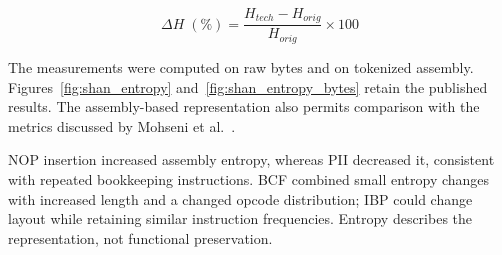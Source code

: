 \documentclass[runningheads]{llncs}
\begin{document}
\begin{equation}
\Delta H \; (\%) = \frac{H_{tech} - H_{orig}}{H_{orig}} \times 100
\end{equation}

The measurements were computed on raw bytes and on tokenized assembly. Figures~\ref{fig:shan_entropy} and~\ref{fig:shan_entropy_bytes} retain the published results. The assembly-based representation also permits comparison with the metrics discussed by Mohseni et al.~\cite{llmobf}.

NOP insertion increased assembly entropy, whereas PII decreased it,
consistent with repeated bookkeeping instructions. BCF combined small
entropy changes with increased length and a changed opcode distribution;
IBP could change layout while retaining similar instruction frequencies.
Entropy describes the representation, not functional preservation.
\end{document}
